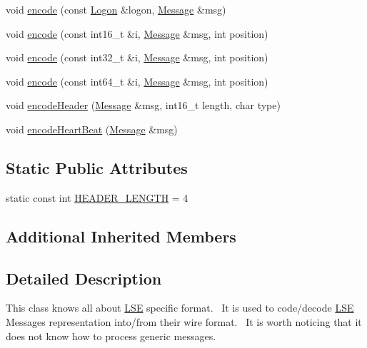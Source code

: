 \begin{DoxyCompactItemize}
void \hyperlink{classMetal_1_1LSE_1_1MilleniumCodec_a2ae620b4b54cf5dc12df16b976af4d34}{encode} (const \hyperlink{classMetal_1_1LSE_1_1Logon}{Logon} \&logon, \hyperlink{classMetal_1_1Message}{Message} \&msg)
\item 
void \hyperlink{classMetal_1_1LSE_1_1MilleniumCodec_ac18633cc651c670a5109a41bcd95f97d}{encode} (const int16\+\_\+t \&i, \hyperlink{classMetal_1_1Message}{Message} \&msg, int position)
\item 
void \hyperlink{classMetal_1_1LSE_1_1MilleniumCodec_a2e03a581bc766181022097a49e54887a}{encode} (const int32\+\_\+t \&i, \hyperlink{classMetal_1_1Message}{Message} \&msg, int position)
\item 
void \hyperlink{classMetal_1_1LSE_1_1MilleniumCodec_a2991a9222389f9ab8266b965a695653f}{encode} (const int64\+\_\+t \&i, \hyperlink{classMetal_1_1Message}{Message} \&msg, int position)
\item 
void \hyperlink{classMetal_1_1LSE_1_1MilleniumCodec_a3b494f4615faf56115c32db1c3fcf4c5}{encode\+Header} (\hyperlink{classMetal_1_1Message}{Message} \&msg, int16\+\_\+t length, char type)
\item 
void \hyperlink{classMetal_1_1LSE_1_1MilleniumCodec_a208c3b0765080cd8fe55b82f9df5a39f}{encode\+Heart\+Beat} (\hyperlink{classMetal_1_1Message}{Message} \&msg)
\end{DoxyCompactItemize}
\subsection*{Static Public Attributes}
\begin{DoxyCompactItemize}
\item 
static const int \hyperlink{classMetal_1_1LSE_1_1MilleniumCodec_a6bdaa076554a16c07ae8e73d6933acfd}{H\+E\+A\+D\+E\+R\+\_\+\+L\+E\+N\+G\+T\+H} = 4
\end{DoxyCompactItemize}
\subsection*{Additional Inherited Members}


\subsection{Detailed Description}
This class knows all about \hyperlink{namespaceMetal_1_1LSE}{L\+S\+E} specific format.~\newline
 It is used to code/decode \hyperlink{namespaceMetal_1_1LSE}{L\+S\+E} Messages representation into/from their wire format.~\newline
 It is worth noticing that it does not know how to process generic messages. 

